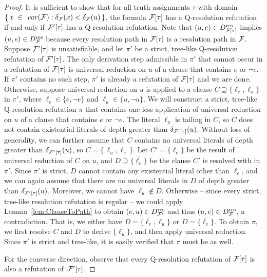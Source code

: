 \documentclass{llncs}
\newcommand{\longversion}[1]{#1}
\newcommand{\shortversion}[1]{}
\newcommand{\Dres}{D^{\text{\normalfont res}}}
\def\hy{\hbox{-}\nobreak\hskip0pt} \newcommand{\ellipsis}{$\dots$}
\newcommand{\SB}{\{\,} \newcommand{\SM}{\;{:}\;} \newcommand{\SE}{\,\}}
\begin{document}
\longversion{\begin{proof} 
  \shortversion{\begin{sloppypar}} It is sufficient to show that for all truth
    assignments $\tau$ with domain $\SB x~\in~\var(\FFF) \SM \delta_{\FFF}(x)
    < \delta_{\FFF}(u) \SE$, the formula $\mathcal{F}[\tau]$ has a Q\hy resolution
    refutation if and only if $\mathcal{F}'[\tau]$ has a Q\hy resolution
    refutation. Note that $(u,e) \in \Dres_{\FFF[\tau]}$ implies $(u, e) \in
    \Dres_{\FFF}$ because every resolution path in $\mathcal{F}[\tau]$ is a
    resolution path in $\mathcal{F}$.  
  \shortversion{\end{sloppypar}} Suppose
  $\mathcal{F}'[\tau]$ is unsatisfiable, and let $\pi'$ be a strict, tree\hy like
  Q\hy resolution refutation of $\mathcal{F}'[\tau]$. The only derivation step
  admissible in $\pi'$ that cannot occur in a refutation of $\mathcal{F}[\tau]$ is
  universal reduction on $u$ of a clause that contains $e$ or $\neg e$. If
  $\pi'$ contains no such step, $\pi'$ is already a refutation of $\mathcal{F}[\tau]$
  and we are done. Otherwise, suppose universal reduction on $u$ is applied to
  a clause $C \supseteq \{\ell_e,\ell_u\}$ in $\pi'$, where $\ell_e \in
  \{e,\neg e\}$ and $\ell_u \in \{u, \neg u\}$. We will construct a strict,
  tree\hy like Q\hy resolution refutation $\pi$ that contains one less
  application of universal reduction on $u$ of a clause that contains $e$ or
  $\neg e$. The literal $\ell_u$ is tailing in $C$, so $C$ does not contain
  existential literals of depth greater than
  $\delta_{\mathcal{F}'[\tau]}(u)$. Without loss of generality, we can further assume
  that $C$ contains no universal literals of depth greater than
  $\delta_{\mathcal{F}'[\tau]}(u)$, so $C = \SB \ell_u, \ell_e \SE$. Let $C' = \{
  \ell_e \}$ be the result of universal reduction of $C$ on $u$, and $D
  \supseteq \{\overline{\ell_e}\} $ be the clause $C'$ is resolved with in
  $\pi'$. Since $\pi'$ is strict, $D$ cannot contain any existential literal
  other than $\overline{\ell_e}$, and we can again assume that there are no
  universal literals in $D$ of depth greater than
  $\delta_{\mathcal{F}'[\tau]}(u)$. Moreover, we cannot have $\overline{\ell_u}
  \notin D$. Otherwise -- since every strict, tree\hy like resolution
  refutation is regular -- we could apply Lemma~\ref{lem:ClauseToPath} to
  obtain $(e,u) \in \Dres_{\FFF'}$ and thus $(u,e) \in \Dres_{\FFF}$, a
  contradiction. That is, we either have $D = \{\overline{\ell_e}, \ell_u\}$
  or $D = \{\overline{\ell_e}\}$. To obtain $\pi$, we first resolve $C$ and
  $D$ to derive $\{\ell_u\}$, and then apply universal reduction. Since $\pi'$
  is strict and tree\hy like, it is easily verified that $\pi$ must be as
  well.

  For the converse direction, observe that every Q\hy resolution refutation of
  $\mathcal{F}[\tau]$ is also a refutation of~$\mathcal{F}'[\tau]$.
\end{proof}
 }
\end{document}
